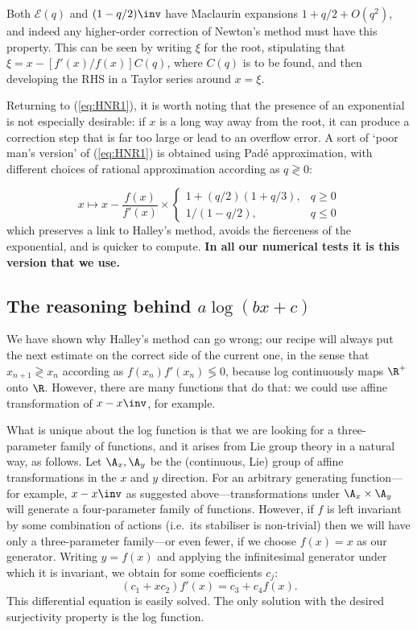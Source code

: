 Both $\mathcal{E}(q)$ and $(1-q/2)\inv$ have Maclaurin expansions $1+q/2+O(q^2)$, and indeed any higher-order correction of Newton's method must have this property.
This can be seen by writing $\xi$ for the root, stipulating that $\xi=x-[f'(x)/f(x)]C(q)$, where $C(q)$ is to be found, and then developing the RHS in a Taylor series around $x=\xi$.

Returning to (\ref{eq:HNR1}), it is worth noting that the presence of an exponential is not especially desirable: if $x$ is a long way away from the root, it can produce a correction step that is far too large or lead to an overflow error. A sort of `poor man's version' of (\ref{eq:HNR1}) is obtained using Pad\'e approximation, with different choices of rational approximation according as $q\gtrless0$:

\begin{equation}
x \mapsto x - \frac{f(x)}{f'(x)} \times \left\{
\begin{array}{ll} 1+(q/2)(1+q/3), & q\ge0 \\ 1/(1-q/2), & q\le 0 \end{array}
 \right.
\label{eq:HNR2}
\end{equation}
which preserves a link to Halley's method, avoids the fierceness of the exponential, and is quicker to compute. 
{\bf In all our numerical tests it is this version that we use.}


\subsection{The reasoning behind $a\log(bx+c)$}

We have shown why Halley's method can go wrong; our recipe will always put the next estimate on the correct side of the current one, in the sense that $x_{n+1}\gtrless x_n$ according as $f(x_n)f'(x_n)\lessgtr0$, because log continuously maps $\R^+$ onto $\R$. However, there are many functions that do that: we could use affine transformation of $x-x\inv$, for example. 

What is unique about the log function is that we are looking for a three-parameter family of functions, and it arises from Lie group theory in a natural way, as follows. Let $\A_x,\A_y$ be the (continuous, Lie) group of affine transformations in the $x$ and $y$ direction. For an arbitrary generating function---for example, $x-x\inv$ as suggested above---transformations under $\A_x\times \A_y$ will generate a four-parameter family of functions.
However, if $f$ is left invariant by some combination of actions (i.e.\ its stabiliser is non-trivial) then we will have only a three-parameter family---or even fewer, if we choose $f(x)=x$ as our generator. Writing $y=f(x)$ and applying the infinitesimal generator under which it is invariant, we obtain for some coefficients $c_j$:
\[
(c_1+xc_2)f'(x) = c_3+c_4f(x).
\]
This differential equation is easily solved. The only solution with the desired surjectivity property is the log function.





